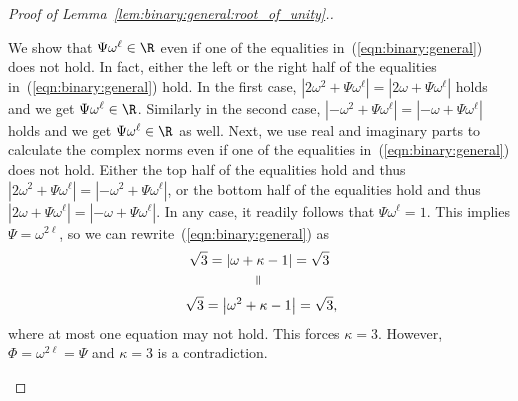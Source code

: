 \documentclass[11pt]{article}
\begin{document}
\begin{proof}[Proof of Lemma~\ref{lem:binary:general:root_of_unity}.]
\begin{enumerate}
  We show that $\Psi \omega^{\ell} \in \R$ even if one of the equalities in~(\ref{eqn:binary:general}) does not hold.
  In fact, either the left or the right half of the equalities in~(\ref{eqn:binary:general}) hold.
  In the first case,
  $|2 \omega^2 + \Psi \omega^\ell| = |2 \omega + \Psi \omega^\ell|$ holds and we get $\Psi \omega^\ell \in \R$.
  Similarly in the second case,
  $|{-}\omega^2 + \Psi \omega^\ell| = |{-}\omega + \Psi \omega^\ell|$ holds and we get $\Psi \omega^\ell \in \R$ as well.
  Next, we use real and imaginary parts to calculate the complex norms even if one of the equalities in~(\ref{eqn:binary:general}) does not hold.
  Either the top half of the equalities hold and thus $|2 \omega^2 + \Psi \omega^\ell| = |{-}\omega^2 + \Psi \omega^\ell|$,
  or the bottom half of the equalities hold and thus $|2 \omega + \Psi \omega^\ell| = |{-}\omega + \Psi \omega^\ell|$.
  In any case,
  it readily follows that $\Psi \omega^\ell = 1$.
  This implies $\Psi = \omega^{2 \ell}$,
  so we can rewrite~(\ref{eqn:binary:general}) as
  \begin{gather*}
   \sqrt{3} = \left|\omega   + \kappa - 1\right| = \sqrt{3}\\
                   \rotatebox{90}{=}\\
   \sqrt{3} = \left|\omega^2 + \kappa - 1\right| = \sqrt{3}\rlap{,}
  \end{gather*}
  where at most one equation may not hold.
  This forces $\kappa = 3$.
  However, $\Phi = \omega^{2 \ell} = \Psi$ and $\kappa = 3$ is a contradiction.
  \qedhere
 \end{enumerate}
\end{proof}
\end{document}
